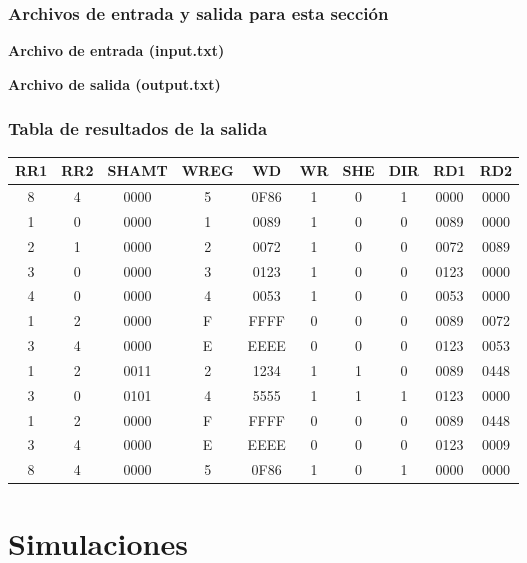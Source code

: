 \documentclass[8pt,executivepaper]{article}
\begin{document}
\subsubsection{Archivos de entrada y salida para esta sección}
\textbf{Archivo de entrada (input.txt)}

\clearpage
\textbf{Archivo de salida (output.txt)}

\subsubsection{Tabla de resultados de la salida}
\begin{tabular}{|c|c|c|c|c|c|c|c|c|c|}
  \hline
  RR1 & RR2 & SHAMT & WREG & WD & WR & SHE & DIR & RD1 & RD2\\
  \hline
  8 & 4 & 0000 & 5 & 0F86 & 1 & 0 & 1 & 0000 & 0000 \\
  1 & 0 & 0000 & 1 & 0089 & 1 & 0 & 0 & 0089 & 0000 \\
  2 & 1 & 0000 & 2 & 0072 & 1 & 0 & 0 & 0072 & 0089 \\
  3 & 0 & 0000 & 3 & 0123 & 1 & 0 & 0 & 0123 & 0000 \\
  4 & 0 & 0000 & 4 & 0053 & 1 & 0 & 0 & 0053 & 0000 \\
  1 & 2 & 0000 & F & FFFF & 0 & 0 & 0 & 0089 & 0072 \\
  3 & 4 & 0000 & E & EEEE & 0 & 0 & 0 & 0123 & 0053 \\
  1 & 2 & 0011 & 2 & 1234 & 1 & 1 & 0 & 0089 & 0448 \\
  3 & 0 & 0101 & 4 & 5555 & 1 & 1 & 1 & 0123 & 0000 \\
  1 & 2 & 0000 & F & FFFF & 0 & 0 & 0 & 0089 & 0448 \\
  3 & 4 & 0000 & E & EEEE & 0 & 0 & 0 & 0123 & 0009 \\
  8 & 4 & 0000 & 5 & 0F86 & 1 & 0 & 1 & 0000 & 0000 \\
  \hline
\end{tabular}
\section{Simulaciones}
\end{document}
